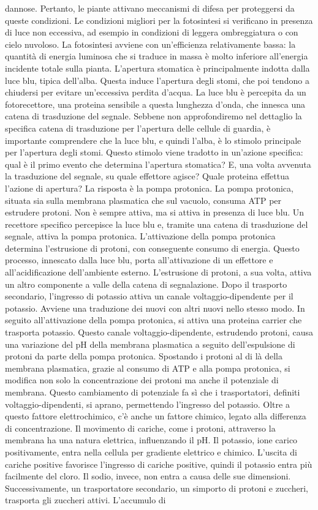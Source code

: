 \documentclass[11pt, a4paper]{article}
\begin{document}
\begin{spacing}{1.15}
dannose. Pertanto, le piante attivano meccanismi di difesa per proteggersi da queste condizioni. Le condizioni migliori per la fotosintesi si verificano in presenza di luce non eccessiva, ad esempio in condizioni di leggera ombreggiatura o con cielo nuvoloso. La fotosintesi avviene con un'efficienza relativamente bassa: la quantità di energia luminosa che si traduce in massa è molto inferiore all'energia incidente totale sulla pianta. L'apertura stomatica è principalmente indotta dalla luce blu, tipica dell'alba.  Questa induce l'apertura degli stomi, che poi tendono a chiudersi per evitare un'eccessiva perdita d'acqua. La luce blu è percepita da un fotorecettore, una proteina sensibile a questa lunghezza d'onda, che innesca una catena di trasduzione del segnale. Sebbene non approfondiremo nel dettaglio la specifica catena di trasduzione per l'apertura delle cellule di guardia, è importante comprendere che la luce blu, e quindi l'alba, è lo stimolo principale per l'apertura degli stomi.  Questo stimolo viene tradotto in un'azione specifica: qual è il primo evento che determina l'apertura stomatica? E, una volta avvenuta la trasduzione del segnale, su quale effettore agisce? Quale proteina effettua l'azione di apertura? La risposta è la pompa protonica. La pompa protonica, situata sia sulla membrana plasmatica che sul vacuolo, consuma ATP per estrudere protoni. Non è sempre attiva, ma si attiva in presenza di luce blu. Un recettore specifico percepisce la luce blu e, tramite una catena di trasduzione del segnale, attiva la pompa protonica. L'attivazione della pompa protonica determina l'estrusione di protoni, con conseguente consumo di energia. Questo processo, innescato dalla luce blu, porta all'attivazione di un effettore e all'acidificazione dell'ambiente esterno. L'estrusione di protoni, a sua volta, attiva un altro componente a valle della catena di segnalazione. Dopo il trasporto secondario, l'ingresso di potassio attiva un canale voltaggio-dipendente per il potassio. Avviene una traduzione dei nuovi con altri nuovi nello stesso modo. In seguito all'attivazione della pompa protonica, si attiva una proteina carrier che trasporta potassio. Questo canale voltaggio-dipendente, estrudendo protoni, causa una variazione del pH della membrana plasmatica a seguito dell'espulsione di protoni da parte della pompa protonica. Spostando i protoni al di là della membrana plasmatica, grazie al consumo di ATP e alla pompa protonica, si modifica non solo la concentrazione dei protoni ma anche il potenziale di membrana. Questo cambiamento di potenziale fa sì che i trasportatori, definiti voltaggio-dipendenti, si aprano, permettendo l'ingresso del potassio. Oltre a questo fattore elettrochimico, c'è anche un fattore chimico, legato alla differenza di concentrazione. Il movimento di cariche, come i protoni, attraverso la membrana ha una natura elettrica, influenzando il pH. Il potassio, ione carico positivamente, entra nella cellula per gradiente elettrico e chimico. L'uscita di cariche positive favorisce l'ingresso di cariche positive, quindi il potassio entra più facilmente del cloro. Il sodio, invece, non entra a causa delle sue dimensioni. Successivamente, un trasportatore secondario, un simporto di protoni e zuccheri, trasporta gli zuccheri attivi. L'accumulo di 
\end{spacing}
\end{document}
